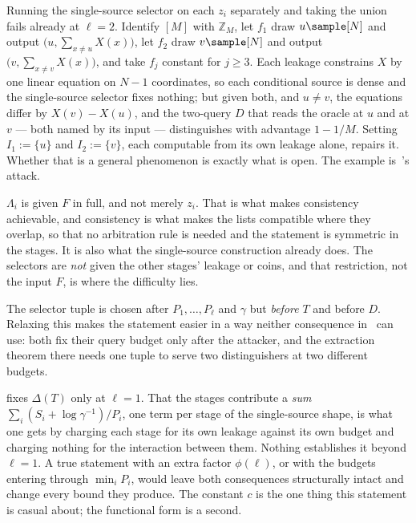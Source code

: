 \documentclass{conjura-conjecture}
\begin{document}
\begin{remark}
\label{rem:separate}
Running the single-source selector on each $z_i$ separately and taking the
union fails already at $\ell = 2$. Identify $[M]$ with $\mathbb{Z}_M$, let
$f_1$ draw $u \sample [N]$ and output $\bigl(u,\sum_{x\ne u}X(x)\bigr)$,
let $f_2$ draw $v \sample [N]$ and output
$\bigl(v,\sum_{x\ne v}X(x)\bigr)$, and take $f_j$ constant for $j \ge 3$.
Each leakage constrains $X$ by one linear equation on $N-1$ coordinates,
so each conditional source is dense and the single-source selector fixes
nothing; but given both, and $u \ne v$, the equations differ by
$X(v)-X(u)$, and the two-query $D$ that reads the oracle at $u$ and at
$v$ --- both named by its input --- distinguishes with advantage $1-1/M$.
Setting $I_1 := \{u\}$ and $I_2 := \{v\}$, each computable from its own
leakage alone, repairs it. Whether that is a general phenomenon is exactly
what is open. The example is~\cite[\S1.4]{CFHS}'s attack.
\end{remark}

\begin{remark}\label{rem:allofF}
$\Lambda_i$ is given $F$ in full, and not merely $z_i$. That is what makes
consistency achievable, and consistency is what makes the lists compatible
where they overlap, so that no arbitration rule is needed and the
statement is symmetric in the stages. It is also what the single-source
construction already does. The selectors are \emph{not} given the other
stages' leakage or coins, and that restriction, not the input $F$, is
where the difficulty lies.
\end{remark}

\begin{remark}\label{rem:order}
The selector tuple is chosen after $P_1,\dots,P_\ell$ and $\gamma$ but
\emph{before} $T$ and before $D$. Relaxing this makes the statement easier
in a way neither consequence in~\cite{PP} can use: both fix their query
budget only after the attacker, and the extraction theorem there needs one
tuple to serve two distinguishers at two different budgets.
\end{remark}

\begin{remark}\label{rem:shape}
\cite{CDGS} fixes $\Delta(T)$ only at $\ell = 1$. That the stages
contribute a \emph{sum} $\sum_i (S_i + \log\gamma^{-1})/P_i$, one term per
stage of the single-source shape, is what one gets by charging each stage
for its own leakage against its own budget and charging nothing for the
interaction between them. Nothing establishes it beyond $\ell = 1$. A true
statement with an extra factor $\phi(\ell)$, or with the budgets entering
through $\min_i P_i$, would leave both consequences structurally intact
and change every bound they produce. The constant $c$ is the one thing
this statement is casual about; the functional form is a second.
\end{remark}
\end{document}

